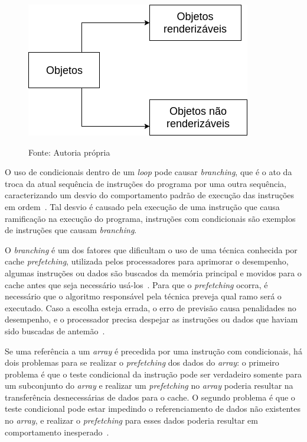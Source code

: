 \begin{figure}[h!]
    \centering
    \includegraphics[width =\textwidth]{../figuras/dodobjectstate}
    \par\medskip
    Fonte: Autoria própria
    \label{dodobjectstate}
\end{figure}

O uso de condicionais dentro de um \textit{loop} pode causar 
\textit{branching}, que é o ato da troca da atual sequência de 
instruções do programa por uma outra sequência, caracterizando um 
desvio do comportamento padrão de execução das instruções em 
ordem~\cite{knuthart}. Tal desvio é causado pela execução de uma instrução que 
causa ramificação na execução do programa, instruções com condicionais 
são exemplos de instruções que causam \textit{branching}.

O \textit{branching} é um dos fatores que dificultam o uso de uma técnica conhecida 
por cache \textit{prefetching}, utilizada pelos processadores para aprimorar o 
desempenho, algumas instruções ou dados são buscados da memória principal e movidos 
para o cache antes que seja necessário usá-los~\cite{smith1982}. Para que o 
\textit{prefetching} ocorra, é necessário que o algoritmo responsável pela 
técnica preveja qual ramo será o executado. Caso a escolha esteja errada, 
o erro de previsão causa penalidades no desempenho, e o processador precisa 
despejar as instruções ou dados que haviam sido buscadas de 
antemão~\cite{tianprefetch}.

Se uma referência a um \textit{array} é precedida por uma instrução com 
condicionais, há dois problemas para se realizar o \textit{prefetching} dos 
dados do \textit{array}: o primeiro problema é que o teste condicional da 
instrução pode ser verdadeiro somente para um subconjunto do \textit{array} 
e realizar um \textit{prefetching} no \textit{array} poderia resultar na 
transferência desnecessárias de dados para o cache. O segundo problema é 
que o teste condicional pode estar impedindo o referenciamento de dados 
não existentes no \textit{array}, e realizar o \textit{prefetching} para 
esses dados poderia resultar em comportamento 
inesperado~\cite{vanderwieldataprefetch}.

